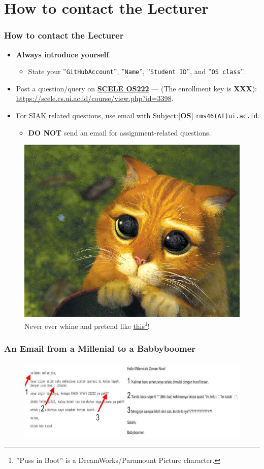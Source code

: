 \documentclass[aspectratio=169, xcolor=table, notheorems, hyperref={pdfpagelabels=false}]{beamer}
\begin{document}
\section{How to contact the Lecturer}
\begin{frame}[fragile]
\frametitle{How to contact the Lecturer}
\begin{itemize}
\item \textbf{Always introduce yourself}.
\begin{itemize}
\item State your ''\texttt{GitHubAccount}'', ''\texttt{Name}'', ''\texttt{Student ID}'', and ''\texttt{OS class}''.
\end{itemize}
\item Post a question/query on 
\href{https://scele.cs.ui.ac.id/course/view.php?id=3398}{\textbf{SCELE OS222}} ---
(The enrollment key is \textbf{XXX}):
\href{https://scele.cs.ui.ac.id/course/view.php?id=3398}{https://scele.cs.ui.ac.id/course/view.php?id=3398}.
\item For SIAK related questions, use email with
Subject:\textbf{[OS]} \texttt{rms46(AT)ui.ac.id}. 
\begin{itemize}
\item \textbf{DO NOT} send an email for assignment-related questions.
\end{itemize}
\end{itemize}

\begin{figure}
\includegraphics[width=0.27\linewidth]{os00-pib}
\caption{Never ever whine and pretend like 
         \href{https://rahmatm.samik-ibrahim.vlsm.org/2013/12/puss-in-boots.html}{this}\footnote{''Puss in Boot'' is a DreamWorks/Paramount Picture character.}!}
\end{figure}
\end{frame}

\begin{frame}
\frametitle{An Email from a Millenial to a Babbyboomer}
\begin{figure}
\includegraphics[width=1.01\linewidth]{os-millenial-mail}
\end{figure}
\end{frame}
\end{document}

